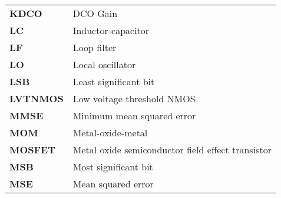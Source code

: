 {\begin{tabular}{@{}ll}
		\textbf{\textsf{KDCO}}	&	DCO Gain \\
		\textbf{\textsf{LC}}	&	Inductor-capacitor \\
		\textbf{\textsf{LF}}	&	Loop filter \\
		\textbf{\textsf{LO}}	&	Local oscillator \\
		\textbf{\textsf{LSB}}	&	Least significant bit \\
		\textbf{\textsf{LVTNMOS}}	&	Low voltage threshold NMOS \\
		\textbf{\textsf{MMSE}}	&	Minimum mean squared error \\
		\textbf{\textsf{MOM}}	&	Metal-oxide-metal \\
		\textbf{\textsf{MOSFET}}	&	Metal oxide semiconductor field effect transistor \\
		\textbf{\textsf{MSB}}	&	Most significant bit \\
		\textbf{\textsf{MSE}}	&	Mean squared error \\
	\end{tabular}}
	\FloatBarrier\pagebreak

